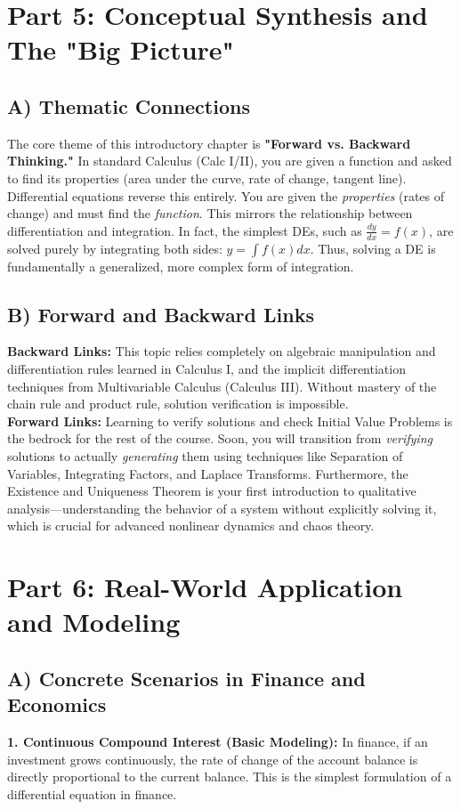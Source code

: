 \documentclass[12pt]{article}
\begin{document}
\newpage
\section{Part 5: Conceptual Synthesis and The "Big Picture"}

\subsection{A) Thematic Connections}
The core theme of this introductory chapter is \textbf{"Forward vs. Backward Thinking."} In standard Calculus (Calc I/II), you are given a function and asked to find its properties (area under the curve, rate of change, tangent line). Differential equations reverse this entirely. You are given the \textit{properties} (rates of change) and must find the \textit{function}. 
This mirrors the relationship between differentiation and integration. In fact, the simplest DEs, such as $\frac{dy}{dx} = f(x)$, are solved purely by integrating both sides: $y = \int f(x) dx$. Thus, solving a DE is fundamentally a generalized, more complex form of integration.

\subsection{B) Forward and Backward Links}
\textbf{Backward Links:} This topic relies completely on algebraic manipulation and differentiation rules learned in Calculus I, and the implicit differentiation techniques from Multivariable Calculus (Calculus III). Without mastery of the chain rule and product rule, solution verification is impossible.
\\
\textbf{Forward Links:} Learning to verify solutions and check Initial Value Problems is the bedrock for the rest of the course. Soon, you will transition from \textit{verifying} solutions to actually \textit{generating} them using techniques like Separation of Variables, Integrating Factors, and Laplace Transforms. Furthermore, the Existence and Uniqueness Theorem is your first introduction to qualitative analysis—understanding the behavior of a system without explicitly solving it, which is crucial for advanced nonlinear dynamics and chaos theory.

\newpage
\section{Part 6: Real-World Application and Modeling}

\subsection{A) Concrete Scenarios in Finance and Economics}
\textbf{1. Continuous Compound Interest (Basic Modeling):}
In finance, if an investment grows continuously, the rate of change of the account balance is directly proportional to the current balance. This is the simplest formulation of a differential equation in finance.
\end{document}
